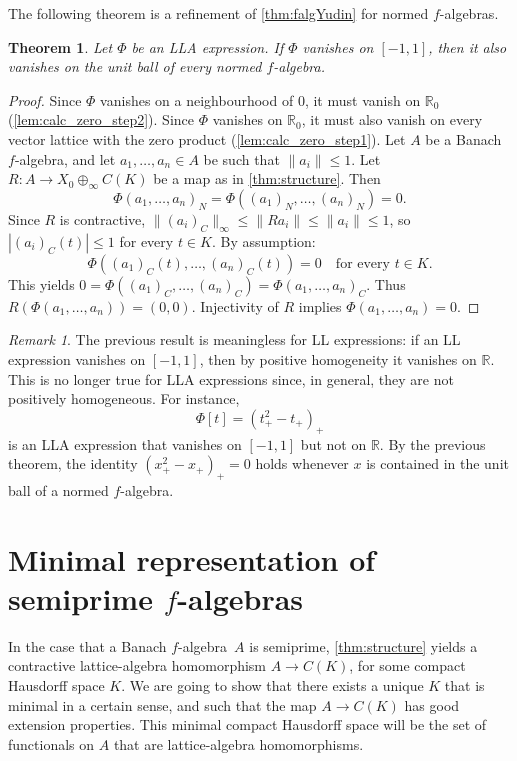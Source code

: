 \documentclass{memo-l}
\newtheorem{thm}[theorem]{Theorem}
\theoremstyle{definition}
\theoremstyle{remark}
\newtheorem{rem}[theorem]{Remark}
\numberwithin{section}{chapter}
\numberwithin{equation}{chapter}
\newcommand\R{\ensuremath{\mathbb{R}}}
\newcommand{\falg}{$f\!$-algebra}
\begin{document}
The following theorem is a refinement of \cref{thm:falgYudin} for
normed \falg s.

\begin{thm}\label{thm:falgYudin_ball}
    Let $\Phi $ be an LLA expression. If $\Phi $
    vanishes on $[-1,1]$, then it also vanishes on the unit ball of
    every normed \falg.
\end{thm}
\begin{proof}
    Since $\Phi $ vanishes on a neighbourhood of $0$, it must vanish
    on $\R_0$ (\cref{lem:calc_zero_step2}). Since $\Phi $ vanishes on
    $\R_0$, it must also vanish on every
    vector lattice with the zero product (\cref{lem:calc_zero_step1}).
    Let $A$ be a Banach \falg, and let $a_1,\ldots ,a_n \in A$ be such
    that $\|a_i\|\le 1$.
    Let $R\colon
    A\to X_0\oplus_\infty C(K)$ be a map as in \cref{thm:structure}.
    Then
    \[
    \Phi (a_1,\ldots ,a_n)_N=\Phi ((a_1)_N,\ldots ,(a_n)_N)=0.
    \]
    Since $R$ is contractive, $\|(a_i)_C\|_\infty
    \le \|Ra_i\|\le \|a_i\|\le 1$, so $|(a_i)_C(t)|\le 1$ for every $t
    \in K$. By assumption:
    \[
    \Phi ((a_1)_C(t),\ldots ,(a_n)_C(t))=0\quad\text{for every }t \in
    K.
    \]
    This yields $0=\Phi ((a_1)_C,\ldots ,(a_n)_C)=\Phi (a_1,\ldots ,a_n)_C$.
    Thus $R(\Phi (a_1,\ldots ,a_n))=(0,0)$. Injectivity of $R$ implies
    $\Phi (a_1,\ldots ,a_n)=0$.
\end{proof}

\begin{rem}\label{rem:LLA vanishing}
    The previous result is meaningless for LL expressions: if an
    LL expression vanishes on $[-1,1]$, then by positive homogeneity it
    vanishes on $\R$. This is no longer
    true for LLA expressions since, in general, they are not
    positively homogeneous. For instance,
    \[
        \Phi [t]=(t_+^2 - t_+)_+
    \]
    is an LLA expression that vanishes on $[-1,1]$ but not on $\R$. By
    the previous theorem, the identity $(x_+^2-x_+)_+=0$ holds whenever $x$ is
    contained in the unit ball of a normed \falg.
\end{rem}

\section{Minimal representation of semiprime $f$-algebras}

In the case that a Banach \falg\ $A$ is semiprime,
\cref{thm:structure} yields a contractive lattice-algebra homomorphism
$A\to C(K)$, for some compact Hausdorff space $K$. We are going to
show that there exists a unique $K$ that is minimal in a certain sense,
and such that the map $A\to C(K)$ has good extension
properties. This minimal compact Hausdorff space will be the set of
functionals on $A$ that are lattice-algebra homomorphisms.
\end{document}
